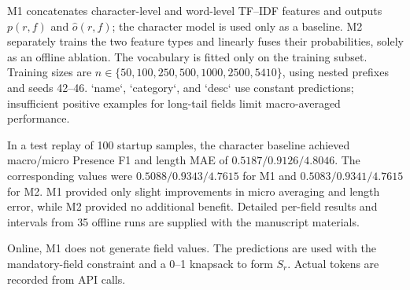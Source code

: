 \documentclass[runningheads]{llncs}
\newcommand{\method}{M1}
\begin{document}
\method{} concatenates character-level and word-level TF--IDF features and outputs $p(r,f)$ and $\hat{o}(r,f)$; the character model is used only as a baseline. \textsc{M2} separately trains the two feature types and linearly fuses their probabilities, solely as an offline ablation. The vocabulary is fitted only on the training subset. Training sizes are $n\in\{50,100,250,500,1000,2500,5410\}$, using nested prefixes and seeds 42--46. `name`, `category`, and `desc` use constant predictions; insufficient positive examples for long-tail fields limit macro-averaged performance.

\begin{sloppypar}
\setlength{\emergencystretch}{4em}
In a test replay of 100 startup samples, the character baseline achieved macro/micro Presence F1 and length MAE of $0.5187/0.9126/4.8046$. The corresponding values were $0.5088/0.9343/4.7615$ for \method{} and $0.5083/0.9341/4.7615$ for \textsc{M2}. \method{} provided only slight improvements in micro averaging and length error, while \textsc{M2} provided no additional benefit. Detailed per-field results and intervals from 35 offline runs are supplied with the manuscript materials.
\end{sloppypar}

\begin{sloppypar}
Online, \method{} does not generate field values. The predictions are used with the mandatory-field constraint and a 0--1 knapsack to form $S_r$. Actual tokens are recorded from API calls.
\end{sloppypar}
\end{document}
